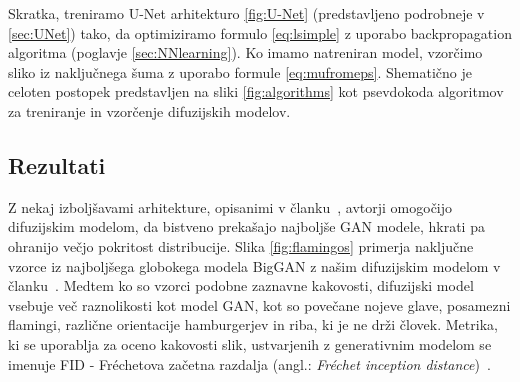 \documentclass[12pt, a4paper]{article}
\begin{document}
Skratka, treniramo U-Net arhitekturo \ref{fig:U-Net} (predstavljeno podrobneje v \ref{sec:UNet}) tako, da optimiziramo formulo \ref{eq:lsimple} z uporabo backpropagation algoritma (poglavje \ref{sec:NNlearning}). Ko imamo natreniran model, vzorčimo sliko iz naključnega šuma z uporabo formule \ref{eq:mufromeps}. Shematično je celoten postopek predstavljen na sliki \ref{fig:algorithms} kot psevdokoda algoritmov za treniranje in vzorčenje difuzijskih modelov.





\subsection{Rezultati}

Z nekaj izboljšavami arhitekture, opisanimi v članku~\cite{DMs-beat-GANs}, avtorji omogočijo difuzijskim modelom, da bistveno prekašajo najboljše GAN modele, hkrati pa ohranijo večjo pokritost distribucije.
Slika \ref{fig:flamingos} primerja naključne vzorce iz najboljšega globokega modela BigGAN z našim difuzijskim modelom v članku~\cite{DMs-beat-GANs}.
Medtem ko so vzorci podobne zaznavne kakovosti, difuzijski model vsebuje več raznolikosti kot model GAN, kot so povečane nojeve glave, posamezni flamingi, različne orientacije hamburgerjev in riba, ki je ne drži človek. Metrika, ki se uporablja za oceno kakovosti slik, ustvarjenih z generativnim modelom se imenuje FID - Fréchetova začetna razdalja (angl.: \textit{Fréchet inception distance})~\cite{FID}.
\end{document}
